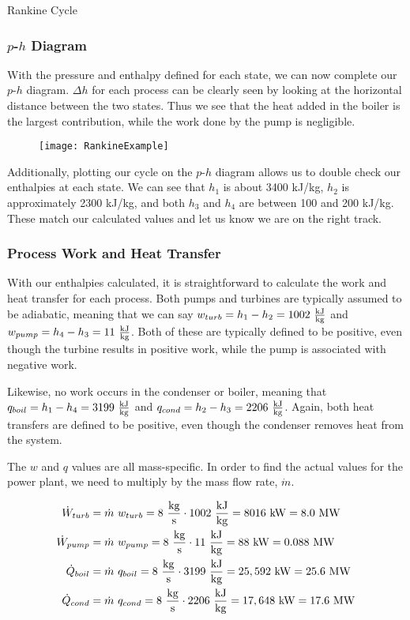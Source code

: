 \begin{example}[label=ex:RankineCycle]{Rankine Cycle}
  \subsubsection*{$p$-$h$ Diagram}
  With the pressure and enthalpy defined for each state, we can now complete our $p$-$h$ diagram. $\Delta h$ for each process can be clearly seen by looking at the horizontal distance between the two states.  Thus we see that the heat added in the boiler is the largest contribution, while the work done by the pump is negligible.

  \begin{figure}[H]
    \centering
    \texttt{[image: RankineExample]}
  \end{figure}

  Additionally, plotting our cycle on the $p$-$h$ diagram allows us to double check our enthalpies at each state.  We can see that $h_1$ is about 3400 kJ/kg, $h_2$ is approximately 2300 kJ/kg, and both $h_3$ and $h_4$ are between 100 and 200 kJ/kg.  These match our calculated values and let us know we are on the right track.
  \subsubsection*{Process Work and Heat Transfer}

  With our enthalpies calculated, it is straightforward to calculate the work and heat transfer for each process.  Both pumps and turbines are typically assumed to be adiabatic, meaning that we can say $w_{turb} = h_1 - h_2 = 1002\ \rm\frac{kJ}{kg}$ and $w_{pump} = h_4 - h_3 = 11\ \rm\frac{kJ}{kg}$.  Both of these are typically defined to be positive, even though the turbine results in positive work, while the pump is associated with negative work.

  Likewise, no work occurs in the condenser or boiler, meaning that $q_{boil} = h_1 - h_4 =  3199\ \rm\frac{kJ}{kg}$ and $q_{cond} = h_2 - h_3 = 2206\ \rm\frac{kJ}{kg}$.  Again, both heat transfers are defined to be positive, even though the condenser removes heat from the system.

  The $w$ and $q$ values are all mass-specific.  In order to find the actual values for the power plant, we need to multiply by the mass flow rate, $\dot{m}$.

  \begin{align*}
    \dot{W}_{turb} &= \dot{m}\ w_{turb} = 8\ \frac{\rm kg}{\rm s} \cdot 1002\ \frac{\rm kJ}{\rm kg} = 8016\ {\rm kW} = 8.0\ {\rm MW} \\
    \dot{W}_{pump} &= \dot{m}\ w_{pump} = 8\ \frac{\rm kg}{\rm s} \cdot 11\ \frac{\rm kJ}{\rm kg} = 88\ {\rm kW} = 0.088\ {\rm MW} \\
    \dot{Q}_{boil} &= \dot{m}\ q_{boil} = 8\ \frac{\rm kg}{\rm s} \cdot 3199\ \frac{\rm kJ}{\rm kg} = 25,592\ {\rm kW} = 25.6\ {\rm MW} \\
    \dot{Q}_{cond} &= \dot{m}\ q_{cond} = 8\ \frac{\rm kg}{\rm s} \cdot 2206\ \frac{\rm kJ}{\rm kg} = 17,648\ {\rm kW} = 17.6\ {\rm MW} 
  \end{align*}


\end{example}
